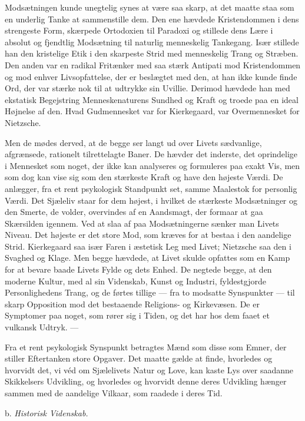 \documentclass[12pt,a4paper,openany]{book}
\newcommand{\opage}[1]{\marginnote{\footnotesize\textit{[#1]}}}
\newcommand{\sectionhead}[2]{\par\bigskip\phantomsection\begin{center}#1 \textit{#2}\end{center}\addcontentsline{toc}{section}{#1 #2}\medskip\ignorespaces}
\begin{document}
Modsætningen kunde unegtelig synes at være saa skarp, at det
maatte staa som en underlig Tanke at sammenstille dem. Den ene
hævdede Kristendommen i dens strengeste Form, skærpede Ortodoxien
til Paradoxi og stillede dens Lære i absolut og fjendtlig Modsætning
til naturlig menneskelig Tankegang. Især stillede han den
kristelige Etik i den skarpeste Strid med menneskelig Trang og
Stræben. Den anden var en radikal Fritænker med saa stærk Antipati
mod Kristendommen og mod enhver Livsopfattelse, der er beslægtet
med den, at han ikke kunde finde Ord, der var stærke nok
til at udtrykke sin Uvillie. Derimod hævdede han med ekstatisk Begejstring
Menneskenaturens Sundhed og Kraft og troede paa en ideal
Højnelse af den. Hvad Gudmennesket var for Kierkegaard, var Overmennesket
for Nietzsche.

Men de mødes derved, at de begge ser langt ud over Livets sædvanlige,
afgrænsede, rationelt tilrettelagte Baner. De hævder det inderste,
det oprindelige i Mennesket som noget, der ikke kan analyseres
og formuleres paa exakt Vis, men som dog kan vise sig som
den stærkeste Kraft og have den højeste Værdi. De anlægger, fra et
rent psykologisk Standpunkt set, samme Maalestok for personlig
Værdi. Det Sjæleliv staar for dem højest, i hvilket de stærkeste Modsætninger
og den Smerte, de volder, overvindes af en Aandsmagt,
der formaar at gaa Skærsilden igennem. Ved at slaa af paa Modsætningerne
sænker man Livets Niveau. Det højeste er det store Mod,
som kræves for at bestaa i den aandelige Strid. Kierkegaard saa især
Faren i æstetisk Leg med Livet; Nietzsche saa den i Svaghed og
Klage. Men begge hævdede, at Livet skulde opfattes som en Kamp
for at bevare baade Livets Fylde og dets Enhed. De negtede begge,
at den moderne Kultur, med al sin Videnskab, Kunst og Industri,
fyldestgjorde Personlighedens Trang, og de førtes tillige --- fra to
\opage{53}modsatte Synspunkter --- til skarp Opposition mod det bestaaende
Religions- og Kirkevæsen. De er Symptomer paa noget, som rører
sig i Tiden, og det har hos dem faaet et vulkansk Udtryk. ---

Fra et rent psykologisk Synspunkt betragtes Mænd som disse som
Emner, der stiller Eftertanken store Opgaver. Det maatte gælde at
finde, hvorledes og hvorvidt det, vi véd om Sjælelivets Natur og
Love, kan kaste Lys over saadanne Skikkelsers Udvikling, og hvorledes
og hvorvidt denne deres Udvikling hænger sammen med de
aandelige Vilkaar, som raadede i deres Tid.

\sectionhead{b.}{Historisk Videnskab.}
\end{document}
